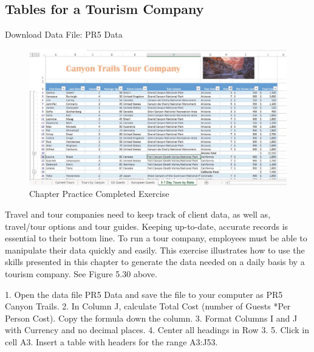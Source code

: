 \subsection{Tables for a Tourism Company}

Download Data File: PR5 Data

\begin{figure}[H]
	\centering
	\includegraphics[width=\maxwidth{.95\linewidth}]{gfx/ch05_fig30}
	\caption{Chapter Practice Completed Exercise}
	\label{05:fig30}
\end{figure}






Travel and tour companies need to keep track of client data, as well as, travel/tour options and tour
guides. Keeping up-to-date, accurate records is essential to their bottom line. To run a tour company,
employees must be able to manipulate their data quickly and easily. This exercise illustrates how to use
the skills presented in this chapter to generate the data needed on a daily basis by a tourism company.
See Figure 5.30 above.

1. Open the data file PR5 Data and save the file to your computer as PR5 Canyon Trails.
2. In Column J, calculate Total Cost (number of Guests *Per Person Cost). Copy the formula down
the column.
3. Format Columns I and J with Currency and no decimal places.
4. Center all headings in Row 3.
5. Click in cell A3. Insert a table with headers for the range A3:J53.


